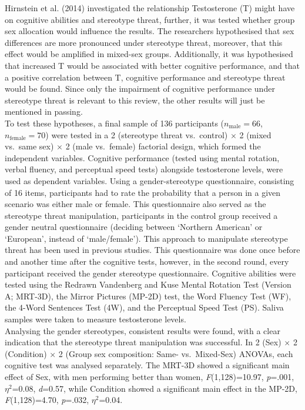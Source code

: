 \documentclass[
  stu,floatsintext]{apa7}
\begin{document}
Hirnstein et al. (2014) investigated the relationship Testosterone (T) might have on cognitive abilities and stereotype threat, further, it was tested whether group sex allocation would influence the results.
The researchers hypothesised that sex differences are more pronounced under stereotype threat, moreover, that this effect would be amplified in mixed-sex groups.
Additionally, it was hypothesised that increased T would be associated with better cognitive performance, and that a positive correlation between T, cognitive performance and stereotype threat would be found.
Since only the impairment of cognitive performance under stereotype threat is relevant to this review, the other results will just be mentioned in passing.\\
To test these hypotheses, a final sample of 136 participants (\(n_{\text{male}}=66\), \(n_{\text{female}}=70\)) were tested in a 2 (stereotype threat vs.~control) \(\times\) 2 (mixed vs.~same sex) \(\times\) 2 (male vs.~female) factorial design, which formed the independent variables.
Cognitive performance (tested using mental rotation, verbal fluency, and perceptual speed tests) alongside testosterone levels, were used as dependent variables.
Using a gender-stereotype questionnaire, consisting of 16 items, participants had to rate the probability that a person in a given scenario was either male or female.
This questionnaire also served as the stereotype threat manipulation, participants in the control group received a gender neutral questionnaire (deciding between `Northern American' or `European', instead of `male/female').
This approach to manipulate stereotype threat has been used in previous studies.
This questionnaire was done once before and another time after the cognitive tests, however, in the second round, every participant received the gender stereotype questionnaire.
Cognitive abilities were tested using the Redrawn Vandenberg and Kuse Mental Rotation Test (Version A; MRT-3D), the Mirror Pictures (MP-2D) test, the Word Fluency Test (WF), the 4-Word Sentences Test (4W), and the Perceptual Speed Test (PS).
Saliva samples were taken to measure testosterone levels.\\
Analysing the gender stereotypes, consistent results were found, with a clear indication that the stereotype threat manipulation was successful.
In 2 (Sex) \(\times\) 2 (Condition) \(\times\) 2 (Group sex composition: Same- vs.~Mixed-Sex) ANOVAs, each cognitive test was analysed separately.
The MRT-3D showed a significant main effect of Sex, with men performing better than women, \emph{F}(1,128)=10.97, \emph{p}=.001, \(\eta^{2}\)=0.08, \emph{d}=0.57, while Condition showed a significant main effect in the MP-2D, \emph{F}(1,128)=4.70, \emph{p}=.032, \(\eta^{2}\)=0.04.
\end{document}

